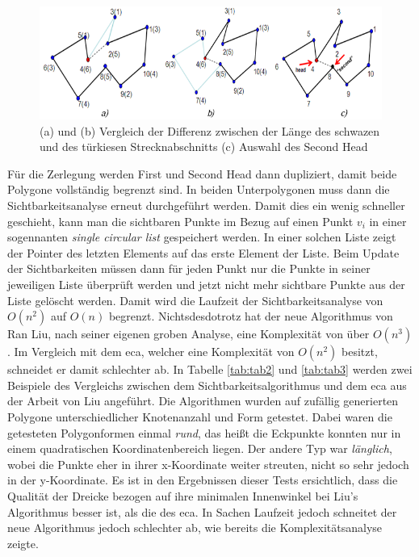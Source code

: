 \begin{figure}[t]
    \centering
    \includegraphics[width=1\textwidth]{bilder/second_head_comp.png}
    \caption[Test zur Auswahl des Second Head]{\centering(a) und (b) Vergleich der Differenz zwischen der Länge des schwazen und des türkiesen Strecknabschnitts (c) Auswahl des Second Head \cite{newAlg} }
    \label{fig:secHead}
\end{figure}

Für die Zerlegung werden First und Second Head dann dupliziert, damit beide Polygone vollständig begrenzt sind. In beiden Unterpolygonen muss dann die Sichtbarkeitsanalyse erneut durchgeführt werden.
Damit dies ein wenig schneller geschieht, kann man die sichtbaren Punkte im Bezug auf einen Punkt $v_i$ in einer sogennanten \emph{single circular list} gespeichert werden. In einer solchen Liste zeigt der Pointer des 
letzten Elements auf das erste Element der Liste. Beim Update der Sichtbarkeiten müssen dann für jeden Punkt nur die Punkte in seiner jeweiligen Liste überprüft werden und jetzt nicht mehr sichtbare Punkte aus der Liste 
gelöscht werden. Damit wird die Laufzeit der Sichtbarkeitsanalyse von $O(n^2)$ auf $O(n)$ begrenzt. Nichtsdesdotrotz hat der neue Algorithmus von Ran Liu, nach seiner eigenen groben Analyse, eine Komplexität von über $O(n^3)$.
Im Vergleich mit dem \ac{eca}, welcher eine Komplexität von $O(n^2)$ besitzt, schneidet er damit schlechter ab. In Tabelle \ref{tab:tab2} und \ref{tab:tab3} werden zwei Beispiele des Vergleichs zwischen dem Sichtbarkeitsalgorithmus 
und dem \ac{eca} aus der Arbeit von Liu angeführt. Die Algorithmen wurden auf zufällig generierten Polygone unterschiedlicher Knotenanzahl und Form getestet. Dabei waren die getesteten Polygonformen einmal \emph{rund}, das heißt 
die Eckpunkte konnten nur in einem quadratischen Koordinatenbereich liegen. Der andere Typ war \emph{länglich}, wobei die Punkte eher in ihrer x-Koordinate weiter streuten, nicht so sehr jedoch in der y-Koordinate.
Es ist in den Ergebnissen dieser Tests ersichtlich, dass die Qualität der Dreicke bezogen auf ihre minimalen Innenwinkel bei Liu's Algorithmus besser ist, als die des \ac{eca}. In Sachen Laufzeit jedoch schneitet der neue Algorithmus jedoch schlechter ab,
wie bereits die Komplexitätsanalyse zeigte.

